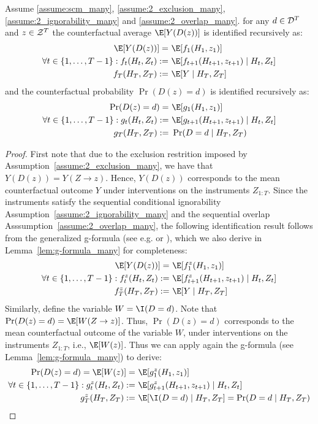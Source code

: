\begin{lemma}\label{lem:2_dte_many}
Assume \ref{assume:scm_many}, \ref{assume:2_exclusion_many}, \ref{assume:2_ignorability_many} and \ref{assume:2_overlap_many}.
for any $d\in {\cal D}^T$ and $z\in {\cal Z}^T$ the counterfactual average $\E[Y(D(z))]$ is identified recursively as: 
\begin{align*}
\E[Y(D(z))]
=~&\E[f_1(H_1, z_1)]\\
\forall t\in \{1,\ldots, T-1\}: f_t(H_t, Z_t) :=~& \E[f_{t+1}(H_{t+1}, z_{t+1})\mid H_t, Z_t]\\
f_{T}(H_T, Z_T) :=~& \E[Y\mid H_T, Z_T]
\end{align*}
and the counterfactual probability $\Pr(D(z)=d)$ is identified recursively as:
\begin{align*}
\Pr(D(z)=d)
=~& \E[g_1(H_1, z_1)]\\
\forall t\in \{1,\ldots, T-1\}: g_t(H_t, Z_t) :=~& \E[g_{t+1}(H_{t+1}, z_{t+1})\mid H_t, Z_t]\\
g_{T}(H_T, Z_T) :=~& \Pr(D=d\mid H_T, Z_T)\\
\end{align*}
\end{lemma}
\begin{proof}
First note that due to the exclusion restrition imposed by Assumption~\ref{assume:2_exclusion_many}, we have that $Y(D(z))=Y(Z\to z)$. Hence, $Y(D(z))$ corresponds to the mean counterfactual outcome $Y$ under interventions on the instruments $Z_{1:T}$. Since the instruments satisfy the sequential conditional ignorability Assumption~\ref{assume:2_ignorability_many} and the sequential overlap Asssumption~\ref{assume:2_overlap_many}, the following identification result follows from the generalized g-formula (see e.g. \cite[Chapter 21]{hernancausal} or \cite[Theorem 1]{chernozhukov2022automatic}), which we also derive in Lemma~\ref{lem:g-formula_many} for completeness:
\begin{align*}
\E[Y(D(z))]
=~&\E[f_1^z(H_1, z_1)]\\
\forall t\in \{1,\ldots, T-1\}: f_t^z(H_t, Z_t) :=~& \E[f_{t+1}^z(H_{t+1}, z_{t+1})\mid H_t, Z_t]\\
f_{T}^z(H_T, Z_T) :=~& \E[Y\mid H_T, Z_T]
\end{align*}
Similarly, define the variable $W=\I(D=d)$. Note that $\Pr(D(z)=d) = \E[W(Z\to z)]$. Thus, $\Pr(D(z)=d)$ corresponds to the mean counterfactual outcome of the variable $W$, under interventions on the instruments $Z_{1:T}$, i.e., $\E[W(z)]$. Thus we can apply again the g-formula (see Lemma~\ref{lem:g-formula_many}) to derive:
\begin{align*}
\Pr(D(z)=d)
=\E[W(z)]=~& \E[g_1^z(H_1, z_1)]\\
\forall t\in \{1,\ldots, T-1\}: g_t^z(H_t, Z_t) :=~& \E[g_{t+1}^z(H_{t+1}, z_{t+1})\mid H_t, Z_t]\\
g_{T}^z(H_T, Z_T) :=~& \E[\I(D=d)\mid H_T, Z_T] = \Pr(D=d\mid H_T, Z_T)\\
\end{align*}




\end{proof}



